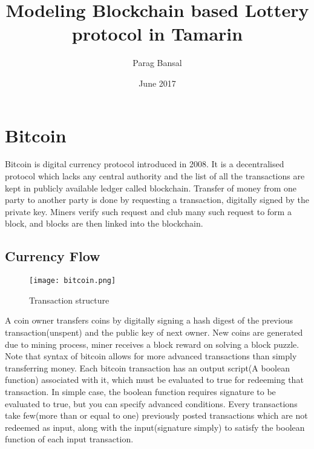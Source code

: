 \documentclass[a4paper]{article}
\title{Modeling Blockchain based Lottery protocol in Tamarin}
\author{Parag Bansal}
\date{June 2017}
\begin{document}
\maketitle
\section{Bitcoin}

Bitcoin is digital currency protocol introduced in 2008. It is a decentralised protocol which lacks any central authority and the list of all the transactions are kept in publicly available ledger called blockchain. Transfer of money from one party to another party is done by requesting a transaction, digitally signed by the private key. Miners verify such request and club many such request to form a block, and blocks are then linked into the blockchain.\\

\subsection{Currency Flow}

\begin{wrapfigure}{r}{0.5\textwidth}
  \begin{center}
    \texttt{[image: bitcoin.png]}
  \end{center}
  \caption{Transaction structure}
\end{wrapfigure}
A coin owner transfers coins by digitally signing a hash digest of the previous transaction(unspent) and the public key of next owner. New coins are generated due to mining process, miner receives a block reward on solving a block puzzle.\\ Note that syntax of bitcoin allows for more advanced transactions than simply transferring money. Each bitcoin transaction has an output script(A boolean function) associated with it, which must be evaluated to true for redeeming that transaction. In simple case, the boolean function requires signature to be evaluated to true, but you can specify advanced conditions. Every transactions take few(more than or equal to one) previously posted transactions which are not redeemed as input, along with the input(signature simply) to satisfy the boolean function of each input transaction.
\end{document}

